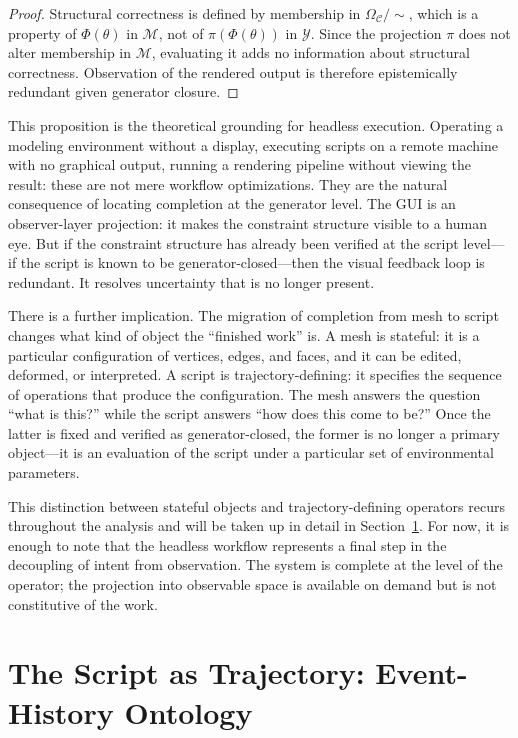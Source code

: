\documentclass[12pt, twoside]{article}
\theoremstyle{plain}
\theoremstyle{definition}
\theoremstyle{remark}
\newcommand{\OmC}{\Omega_{\mathcal{C}}}
\begin{document}
\begin{proof}
Structural correctness is defined by membership in $\OmC / {\sim}$, which is a property of $\Phi(\theta)$ in $\mathcal{M}$, not of $\pi(\Phi(\theta))$ in $\mathcal{Y}$. Since the projection $\pi$ does not alter membership in $\mathcal{M}$, evaluating it adds no information about structural correctness. Observation of the rendered output is therefore epistemically redundant given generator closure.
\end{proof}

This proposition is the theoretical grounding for headless execution. Operating a modeling environment without a display, executing scripts on a remote machine with no graphical output, running a rendering pipeline without viewing the result: these are not mere workflow optimizations. They are the natural consequence of locating completion at the generator level. The GUI is an observer-layer projection: it makes the constraint structure visible to a human eye. But if the constraint structure has already been verified at the script level---if the script is known to be generator-closed---then the visual feedback loop is redundant. It resolves uncertainty that is no longer present.

There is a further implication. The migration of completion from mesh to script changes what kind of object the ``finished work'' is. A mesh is stateful: it is a particular configuration of vertices, edges, and faces, and it can be edited, deformed, or interpreted. A script is trajectory-defining: it specifies the sequence of operations that produce the configuration. The mesh answers the question ``what is this?'' while the script answers ``how does this come to be?'' Once the latter is fixed and verified as generator-closed, the former is no longer a primary object---it is an evaluation of the script under a particular set of environmental parameters.

This distinction between stateful objects and trajectory-defining operators recurs throughout the analysis and will be taken up in detail in Section~\ref{sec:trajectory}. For now, it is enough to note that the headless workflow represents a final step in the decoupling of intent from observation. The system is complete at the level of the operator; the projection into observable space is available on demand but is not constitutive of the work.

\section{The Script as Trajectory: Event-History Ontology}
\label{sec:trajectory}
\end{document}
